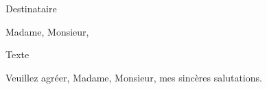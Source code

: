 \documentclass[a4paper,10pt]{lettre}
\makeatletter
\newcommand*{\NoRule}{\renewcommand*{\rule@length}{0}}
\makeatother
\begin{document}

\begin{letter}{Destinataire} %
\NoRule

\openingspace=0pt
\sigspace=0pt

\marge{0mm}

\makeatletter
		\def\pict@let@width{185}       %
		\def\pict@let@height{65}       %
		\def\pict@let@hoffset{0}       %
		\def\pict@let@voffset{0}       %
		\def\rule@length{0}           %
		\def\fromaddress@let@hpos{0} %
		\def\fromaddress@let@vpos{70}  %
		\fromaddress@let@width=50mm    %
		\def\fromlieu@let@hpos{117}     %
		\def\fromlieu@let@vpos{15}      %
		\fromlieu@let@width=50mm       %
		\def\toaddress@let@hpos{95}    %
		\def\toaddress@let@vpos{45}    %
		\toaddress@let@width=65mm      %
\makeatother

\address{Hélène Arduin\\
55 rue des Arcs Saint Cyprien\\
31300 Toulouse}
\nofax

\renewcommand{\tellabelname}{}
\renewcommand{\emaillabelname}{}


\def\concname{Objet :~} %

\opening{Madame, Monsieur,}

Texte

\closing{Veuillez agréer, Madame, Monsieur, mes sincères salutations.}

\end{letter}
\end{document}
